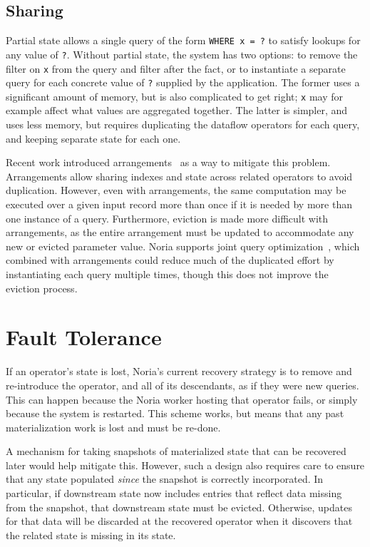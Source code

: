 \subsection{Sharing}

Partial state allows a single query of the form \texttt{WHERE x = ?} to satisfy
lookups for any value of \texttt{?}. Without partial state, the system has two
options: to remove the filter on \texttt{x} from the query and filter after the
fact, or to instantiate a separate query for each concrete value of \texttt{?}
supplied by the application. The former uses a significant amount of memory, but
is also complicated to get right; \texttt{x} may for example affect what values
are aggregated together. The latter is simpler, and uses less memory, but
requires duplicating the dataflow operators for each query, and keeping separate
state for each one.

Recent work introduced arrangements~\cite{arrangements} as a way to mitigate
this problem. Arrangements allow sharing indexes and state across related
operators to avoid duplication. However, even with arrangements, the same
computation may be executed over a given input record more than once if it is
needed by more than one instance of a query. Furthermore, eviction is made more
difficult with arrangements, as the entire arrangement must be updated to
accommodate any new or evicted parameter value. Noria supports joint query
optimization~\cite{noria}, which combined with arrangements could reduce much of
the duplicated effort by instantiating each query multiple times, though this
does not improve the eviction process.

\section{Fault Tolerance}

If an operator's state is lost, Noria's current recovery strategy is to remove
and re-introduce the operator, and all of its descendants, as if they were new
queries. This can happen because the Noria worker hosting that operator fails,
or simply because the system is restarted. This scheme works, but means that any
past materialization work is lost and must be re-done.

A mechanism for taking snapshots of materialized state that can be recovered
later would help mitigate this. However, such a design also requires care to
ensure that any state populated \emph{since} the snapshot is correctly
incorporated. In particular, if downstream state now includes entries that
reflect data missing from the snapshot, that downstream state must be evicted.
Otherwise, updates for that data will be discarded at the recovered operator
when it discovers that the related state is missing in its state.

